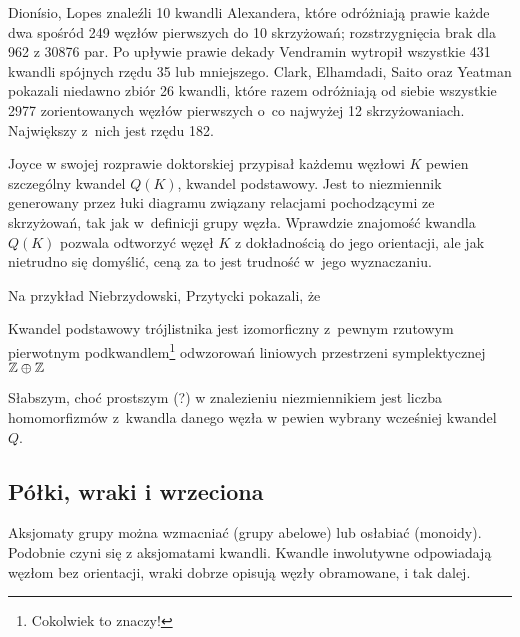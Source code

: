 Dionísio, Lopes \cite{lopes2003} znaleźli 10 kwandli Alexandera, które odróżniają prawie każde dwa spośród 249 węzłów pierwszych do 10 skrzyżowań; rozstrzygnięcia brak dla 962 z 30876 par.
%
%
Po upływie prawie dekady Vendramin \cite{vendramin2012} wytropił wszystkie 431 kwandli spójnych rzędu 35 lub mniejszego.
%
Clark, Elhamdadi, Saito oraz Yeatman \cite{clark2013} pokazali niedawno zbiór 26 kwandli, które razem odróżniają od siebie wszystkie 2977 zorientowanych węzłów pierwszych o~co najwyżej 12 skrzyżowaniach.
%
%
%
%
Największy z~nich jest rzędu 182.

Joyce w swojej rozprawie doktorskiej przypisał każdemu węzłowi $K$ pewien szczególny kwandel $Q(K)$, kwandel podstawowy.
%
%
Jest to niezmiennik generowany przez łuki diagramu związany relacjami pochodzącymi ze skrzyżowań, tak jak w~definicji grupy węzła.
Wprawdzie znajomość kwandla $Q(K)$ pozwala odtworzyć węzęł $K$ z dokładnością do jego orientacji, ale jak nietrudno się domyślić, ceną za to jest trudność w~jego wyznaczaniu.

Na przykład Niebrzydowski, Przytycki \cite{niebrzydowski2009} pokazali, że
%
%

\begin{example}
    Kwandel podstawowy trójlistnika  jest izomorficzny z~pewnym rzutowym pierwotnym podkwandlem\footnote{Cokolwiek to znaczy!} odwzorowań liniowych przestrzeni symplektycznej $\mathbb Z \oplus \mathbb Z$
\end{example}

Słabszym, choć prostszym (?) w znalezieniu niezmiennikiem jest liczba homomorfizmów z~kwandla danego węzła w pewien wybrany wcześniej kwandel $Q$.

\subsection{Półki, wraki i wrzeciona}
Aksjomaty grupy można wzmacniać (grupy abelowe) lub osłabiać (monoidy).
Podobnie czyni się z aksjomatami kwandli.
Kwandle inwolutywne odpowiadają węzłom bez orientacji, wraki dobrze opisują węzły obramowane, i tak dalej.
%
%

